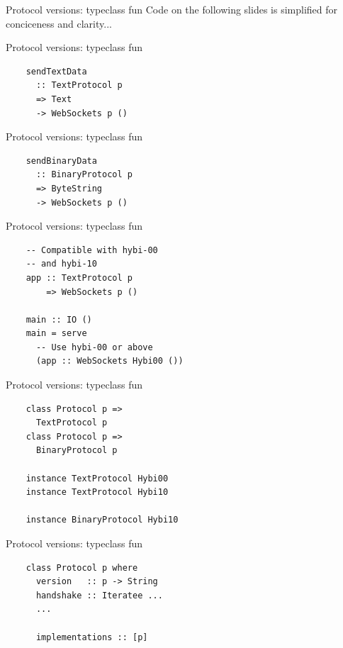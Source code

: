 \documentclass[20pt]{beamer}
\begin{document}
\begin{frame}{Protocol versions: typeclass fun}
    Code on the following slides is simplified for conciceness and clarity...
\end{frame}

\begin{frame}[fragile]{Protocol versions: typeclass fun}
    \begin{lstlisting}
    sendTextData
      :: TextProtocol p
      => Text
      -> WebSockets p ()
    \end{lstlisting}
\end{frame}

\begin{frame}[fragile]{Protocol versions: typeclass fun}
    \begin{lstlisting}
    sendBinaryData
      :: BinaryProtocol p
      => ByteString
      -> WebSockets p ()
    \end{lstlisting}
\end{frame}

\begin{frame}[fragile]{Protocol versions: typeclass fun}
    \begin{lstlisting}
    -- Compatible with hybi-00
    -- and hybi-10
    app :: TextProtocol p
        => WebSockets p ()

    main :: IO ()
    main = serve
      -- Use hybi-00 or above
      (app :: WebSockets Hybi00 ())
    \end{lstlisting}
\end{frame}

\begin{frame}[fragile]{Protocol versions: typeclass fun}
    \begin{lstlisting}
    class Protocol p =>
      TextProtocol p
    class Protocol p =>
      BinaryProtocol p

    instance TextProtocol Hybi00
    instance TextProtocol Hybi10

    instance BinaryProtocol Hybi10
    \end{lstlisting}
\end{frame}

\begin{frame}[fragile]{Protocol versions: typeclass fun}
    \begin{lstlisting}
    class Protocol p where
      version   :: p -> String
      handshake :: Iteratee ...
      ...

      implementations :: [p]
    \end{lstlisting}
\end{frame}
\end{document}
